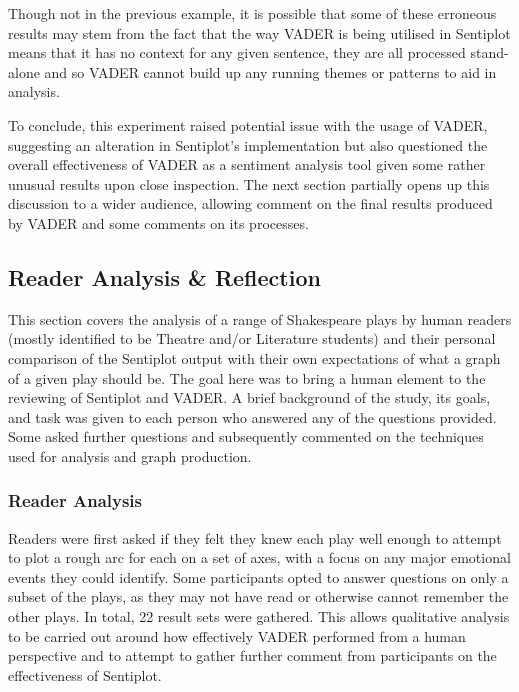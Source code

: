 \documentclass{article}
\begin{document}
{        Though not in the previous example, it is possible that some of these erroneous results may stem from the fact that the way VADER is being utilised in Sentiplot means that it has no context for any given sentence, they are all processed stand-alone and so VADER cannot build up any running themes or patterns to aid in analysis.

        To conclude, this experiment raised potential issue with the usage of VADER, suggesting an alteration in Sentiplot's implementation but also questioned the overall effectiveness of VADER as a sentiment analysis tool given some rather unusual results upon close inspection. The next section partially opens up this discussion to a wider audience, allowing comment on the final results produced by VADER and some comments on its processes.
    \subsection{Reader Analysis \& Reflection}
    \label{subsec:reader}
        This section covers the analysis of a range of Shakespeare plays by human readers (mostly identified to be Theatre and/or Literature students) and their personal comparison of the Sentiplot output with their own expectations of what a graph of a given play should be. The goal here was to bring a human element to the reviewing of Sentiplot and VADER. A brief background of the study, its goals, and task was given to each person who answered any of the questions provided. Some asked further questions and subsequently commented on the techniques used for analysis and graph production.
        \subsubsection{Reader Analysis}
            Readers were first asked if they felt they knew each play well enough to attempt to plot a rough arc for each on a set of axes, with a focus on any major emotional events they could identify. Some participants opted to answer questions on only a subset of the plays, as they may not have read or otherwise cannot remember the other plays. In total, 22 result sets were gathered. This allows qualitative analysis to be carried out around how effectively VADER performed from a human perspective and to attempt to gather further comment from participants on the effectiveness of Sentiplot.

}
\end{document}
